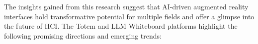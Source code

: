 The insights gained from this research suggest that AI-driven augmented reality interfaces hold transformative potential for multiple fields and offer a glimpse into the future of HCI.
The Totem and LLM Whiteboard platforms highlight the following promising directions and emerging trends:




